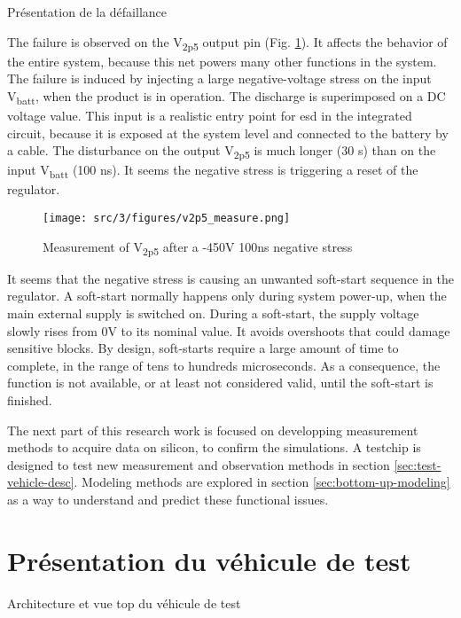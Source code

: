 Présentation de la défaillance

The failure is observed on the V\textsubscript{2p5} output pin (Fig. \ref{fig:meas-reset-v2p5}).
It affects the behavior of the entire system, because this net powers many other functions in the system.
The failure is induced by injecting a large negative-voltage stress on the input V\textsubscript{batt}, when the product is in operation.
The discharge is superimposed on a DC voltage value.
This input is a realistic entry point for \gls{esd} in the integrated circuit, because it is exposed at the system level and connected to the battery by a cable.
The disturbance on the output V\textsubscript{2p5} is much longer (30 \textmu{}s) than on the input V\textsubscript{batt} (100 ns).
It seems the negative stress is triggering a reset of the regulator.

\begin{figure}[!h]
  \centering
  \texttt{[image: src/3/figures/v2p5\_measure.png]}
  \caption{Measurement of V\textsubscript{2p5} after a -450V 100ns negative stress}
  \label{fig:meas-reset-v2p5}
\end{figure}

It seems that the negative stress is causing an unwanted \gls{soft-start} sequence in the regulator.
A soft-start normally happens only during system power-up, when the main external supply is switched on.
During a soft-start, the supply voltage slowly rises from 0V to its nominal value.
It avoids overshoots that could damage sensitive blocks.
By design, soft-starts require a large amount of time to complete, in the range of tens to hundreds microseconds.
As a consequence, the function is not available, or at least not considered valid, until the soft-start is finished.

The next part of this research work is focused on developping measurement methods to acquire data on silicon, to confirm the simulations.
A testchip is designed to test new measurement and observation methods in section \ref{sec:test-vehicle-desc}.
Modeling methods are explored in section \ref{sec:bottom-up-modeling} as a way to understand and predict these functional issues.

\section{Présentation du véhicule de test}

Architecture et vue top du véhicule de test

